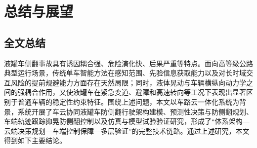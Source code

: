 \chapter{总结与展望}

\section{全文总结}

液罐车侧翻事故具有诱因耦合强、危险演化快、后果严重等特点。面向高等级公路典型运行场景，传统单车智能方法在感知范围、先验信息获取能力以及对长时域交互风险的提前规避能力方面存在天然局限；同时，液体晃动与车辆横纵向动力学之间的强耦合作用，又使液罐车在紧急变道、避障和高速转向等工况下表现出显著区别于普通车辆的稳定性约束特征。围绕上述问题，本文以车路云一体化系统为背景，系统开展了车云协同液罐车防侧翻行驶架构建模、预测性决策与防侧翻规划、车端轨迹跟踪抑晃防侧翻控制以及仿真与模型试验验证研究，形成了“体系架构—云端决策规划—车端控制保障—多层验证”的完整技术链路。通过上述研究，本文得到如下主要结论。

